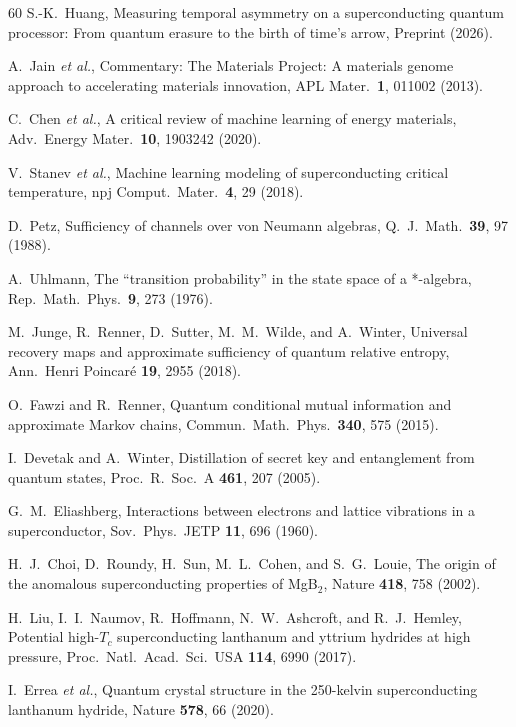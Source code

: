 \documentclass[prb,twocolumn,superscriptaddress,longbibliography,floatfix]{revtex4-2}
\begin{document}
\begin{thebibliography}{60}
S.-K.~Huang,
Measuring temporal asymmetry on a superconducting quantum processor:
From quantum erasure to the birth of time's arrow,
Preprint (2026).

A.~Jain \textit{et al.},
Commentary: The Materials Project: A materials genome approach to accelerating materials innovation,
APL Mater.\ \textbf{1}, 011002 (2013).

C.~Chen \textit{et al.},
A critical review of machine learning of energy materials,
Adv.\ Energy Mater.\ \textbf{10}, 1903242 (2020).

V.~Stanev \textit{et al.},
Machine learning modeling of superconducting critical temperature,
npj Comput.\ Mater.\ \textbf{4}, 29 (2018).

D.~Petz,
Sufficiency of channels over von Neumann algebras,
Q.\ J.\ Math.\ \textbf{39}, 97 (1988).

A.~Uhlmann,
The ``transition probability'' in the state space of a *-algebra,
Rep.\ Math.\ Phys.\ \textbf{9}, 273 (1976).

M.~Junge, R.~Renner, D.~Sutter, M.~M.~Wilde, and A.~Winter,
Universal recovery maps and approximate sufficiency of quantum relative entropy,
Ann.\ Henri Poincar\'e \textbf{19}, 2955 (2018).

O.~Fawzi and R.~Renner,
Quantum conditional mutual information and approximate Markov chains,
Commun.\ Math.\ Phys.\ \textbf{340}, 575 (2015).

I.~Devetak and A.~Winter,
Distillation of secret key and entanglement from quantum states,
Proc.\ R.\ Soc.\ A \textbf{461}, 207 (2005).

G.~M.~Eliashberg,
Interactions between electrons and lattice vibrations in a superconductor,
Sov.\ Phys.\ JETP \textbf{11}, 696 (1960).

H.~J.~Choi, D.~Roundy, H.~Sun, M.~L.~Cohen, and S.~G.~Louie,
The origin of the anomalous superconducting properties of MgB$_2$,
Nature \textbf{418}, 758 (2002).

H.~Liu, I.~I.~Naumov, R.~Hoffmann, N.~W.~Ashcroft, and R.~J.~Hemley,
Potential high-$T_c$ superconducting lanthanum and yttrium hydrides at high pressure,
Proc.\ Natl.\ Acad.\ Sci.\ USA \textbf{114}, 6990 (2017).

I.~Errea \textit{et al.},
Quantum crystal structure in the 250-kelvin superconducting lanthanum hydride,
Nature \textbf{578}, 66 (2020).


\end{thebibliography}
\end{document}
